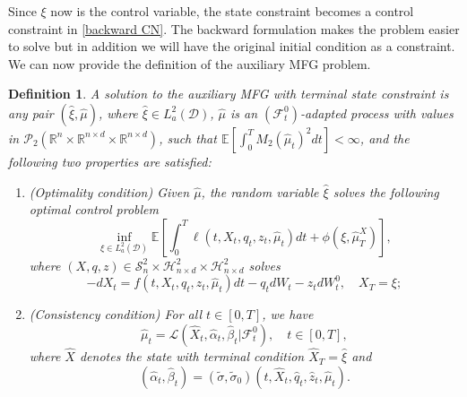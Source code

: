 \documentclass[11pt,a4paper]{article}
\newtheorem{defi}[theo]{Definition}
\begin{document}
Since $\xi$ now is the control variable, the state constraint becomes a control constraint  in \eqref{backward CN}. The backward formulation makes the problem easier to solve but in  addition we will have the original initial condition as a constraint. We can now provide the definition of the auxiliary MFG problem.

\begin{defi} \label{def-auxMFG} A solution to the \emph{auxiliary} MFG with terminal state constraint is any pair $(\hat  \xi, \hat \mu)$, where $\hat \xi \in L^2 _a (\mathcal D)$, $\hat \mu$ is an $(\mathcal F_t ^0)$-adapted process with values in $\mathcal{P}_2(\mathbb{R}^n\times \mathbb{R}^{n\times d} \times \mathbb{R}^{n\times d})$, such that $\mathbb E \left[\int_0^T M_2(\hat \mu_t)^2 dt\right]<\infty$, and the following two properties are satisfied:
\begin{enumerate}
    \item (Optimality condition) Given $\hat \mu$, the random variable $\hat \xi$ solves the following optimal control problem
\begin{equation}
\label{auxoptimal}
     \inf_{\xi\in L^2 _a (\mathcal D)}\mathbb E \left[\int_0^T \ell(t, X_t, q_t, z_t, \hat \mu_t)dt+\phi(\xi, \hat\mu^X_T)\right],
\end{equation}
where $(X,q,z) \in \mathcal S^2_n \times  \mathcal H^2_{n \times d}\times \mathcal H^2_{n\times d}$ solves
\begin{equation}
-dX_t=f(t, X_t, q_t, z_t, \hat \mu_t)dt -q_tdW_t-z_tdW_t^0, \quad X_T=\xi;
\end{equation}
\item (Consistency condition)  For all $t\in [0,T]$, we have \[\hat \mu_t=\mathcal{L}(\hat X_t, \hat\alpha_t, \hat\beta_t |\mathcal{F}_t^0), \quad t\in [0,T], \] where $\hat X$ denotes the state with terminal condition $\hat X_T  = \hat \xi $ and
\begin{equation} (\hat \alpha_t , \hat \beta_t ) = (\tilde \sigma, \tilde \sigma_0)(t, \hat X_t , \hat q_t , \hat z_t , \hat \mu_t ). \label{eq:xi-to-alpha-beta}\end{equation}
\end{enumerate}
\end{defi}
\end{document}
